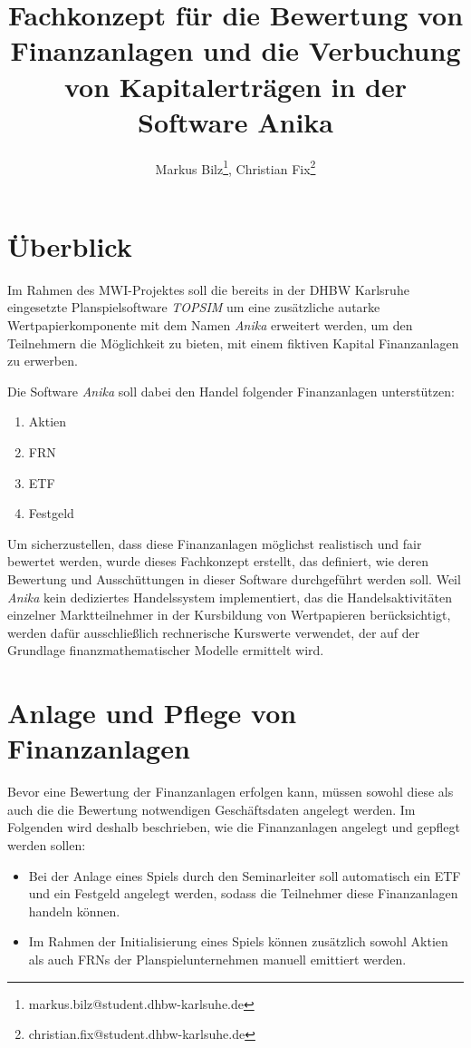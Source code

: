 \documentclass[12pt, a4paper]{article}
\title{Fachkonzept für die Bewertung von Finanzanlagen und die Verbuchung von Kapitalerträgen in der Software Anika}
\author{Markus Bilz\thanks{markus.bilz@student.dhbw-karlsuhe.de}, Christian Fix\thanks{christian.fix@student.dhbw-karlsuhe.de}}
\theoremstyle{plain}
\begin{document}
\maketitle

\section{Überblick}
Im Rahmen des MWI-Projektes soll die bereits in der DHBW Karlsruhe eingesetzte Planspielsoftware \textit{TOPSIM} um eine zusätzliche autarke Wertpapierkomponente mit dem Namen \textit{Anika} erweitert werden, um den Teilnehmern die Möglichkeit zu bieten, mit einem fiktiven Kapital Finanzanlagen zu erwerben.

Die Software \textit{Anika} soll dabei den Handel folgender Finanzanlagen unterstützen:
\begin{enumerate}
	\item Aktien
	\item \gls{FRN}
	\item \gls{ETF}
	\item Festgeld
\end{enumerate}

Um sicherzustellen, dass diese Finanzanlagen möglichst realistisch und fair bewertet werden, wurde dieses Fachkonzept erstellt, das definiert, wie deren Bewertung und Ausschüttungen in dieser Software durchgeführt werden soll.
Weil \textit{Anika} kein dediziertes Handelssystem implementiert, das die Handelsaktivitäten einzelner Marktteilnehmer in der Kursbildung von Wertpapieren berücksichtigt, werden dafür ausschließlich rechnerische Kurswerte verwendet, der auf der Grundlage finanzmathematischer Modelle ermittelt wird.


\section{Anlage und Pflege von Finanzanlagen}
\label{sec:anlage_und_pflege_der_wertpapiere}

Bevor eine Bewertung der Finanzanlagen erfolgen kann, müssen sowohl diese als auch die die Bewertung notwendigen Geschäftsdaten angelegt werden. 
Im Folgenden wird deshalb beschrieben, wie die Finanzanlagen angelegt und gepflegt werden sollen:
\begin{itemize}
	\item Bei der Anlage eines Spiels durch den Seminarleiter soll automatisch ein \gls{ETF} und ein Festgeld angelegt werden, sodass die Teilnehmer diese Finanzanlagen handeln können.
	\item Im Rahmen der Initialisierung eines Spiels können zusätzlich sowohl Aktien als auch \glspl{FRN} der Planspielunternehmen manuell emittiert werden.  
\end{itemize}
\end{document}
